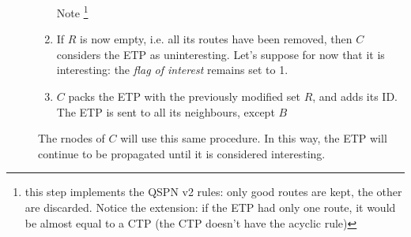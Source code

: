 \documentclass[a4paper]{article}
\newcommand{\T}[1]{\textrm{#1}}
\begin{document}
\begin{description}
\begin{enumerate}
		Note \footnote{this step implements the QSPN v2 rules: only
		good routes are kept, the other are discarded. Notice
		the extension: if the ETP had only one route, it would be
		almost equal to a CTP (the CTP doesn't have the acyclic rule)}
	\item If $R$ is now empty, i.e. all its routes have been removed, then
		$C$ considers the ETP as uninteresting. Let's suppose for now
		that it is interesting: the \emph{flag of interest} remains
		set to	1.
	\item $C$ packs the ETP with the previously modified
		set $R$, and adds its ID. The ETP is sent to all its neighbours,
		except $B$
	\end{enumerate}
	The rnodes of $C$ will use this same procedure. In this way, the ETP
	will continue to be propagated until it is considered interesting.


\end{description}
\end{document}
